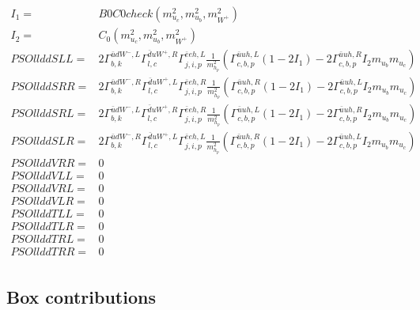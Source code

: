 \documentclass[A4,landscape]{article}
\begin{document}
\begin{align} 
I_1= & B0C0check(m^2_{u_{{c}}}, m^2_{u_{{b}}}, m^2_{W^+}) \\ 
I_2= & C_0(m^2_{u_{{c}}}, m^2_{u_{{b}}}, m^2_{W^+}) \\ 
  PSOllddSLL= & 2  \Gamma^{\bar{u}d W^-,L}_{b, k} \Gamma^{\bar{d}u W^+ ,R}_{l, c} \Gamma^{\bar{e}e h ,L}_{j, i, p} \frac{1}{m^2_{h_{{p}}}} (\Gamma^{\bar{u}u h ,L}_{c, b, p} (1 - 2 I_1) - 2 \Gamma^{\bar{u}u h ,R}_{c, b, p} I_2 m_{u_{{b}}} m_{u_{{c}}}) \\ 
  PSOllddSRR= & 2  \Gamma^{\bar{u}d W^-,R}_{b, k} \Gamma^{\bar{d}u W^+ ,L}_{l, c} \Gamma^{\bar{e}e h ,R}_{j, i, p} \frac{1}{m^2_{h_{{p}}}} (\Gamma^{\bar{u}u h ,R}_{c, b, p} (1 - 2 I_1) - 2 \Gamma^{\bar{u}u h ,L}_{c, b, p} I_2 m_{u_{{b}}} m_{u_{{c}}}) \\ 
  PSOllddSRL= & 2  \Gamma^{\bar{u}d W^-,L}_{b, k} \Gamma^{\bar{d}u W^+ ,R}_{l, c} \Gamma^{\bar{e}e h ,R}_{j, i, p} \frac{1}{m^2_{h_{{p}}}} (\Gamma^{\bar{u}u h ,L}_{c, b, p} (1 - 2 I_1) - 2 \Gamma^{\bar{u}u h ,R}_{c, b, p} I_2 m_{u_{{b}}} m_{u_{{c}}}) \\ 
  PSOllddSLR= & 2  \Gamma^{\bar{u}d W^-,R}_{b, k} \Gamma^{\bar{d}u W^+ ,L}_{l, c} \Gamma^{\bar{e}e h ,L}_{j, i, p} \frac{1}{m^2_{h_{{p}}}} (\Gamma^{\bar{u}u h ,R}_{c, b, p} (1 - 2 I_1) - 2 \Gamma^{\bar{u}u h ,L}_{c, b, p} I_2 m_{u_{{b}}} m_{u_{{c}}}) \\ 
  PSOllddVRR= & 0 \\ 
  PSOllddVLL= & 0 \\ 
  PSOllddVRL= & 0 \\ 
  PSOllddVLR= & 0 \\ 
  PSOllddTLL= & 0 \\ 
  PSOllddTLR= & 0 \\ 
  PSOllddTRL= & 0 \\ 
  PSOllddTRR= & 0 \\ 
\end{align} 
\subsection{Box contributions} 
\end{document}
